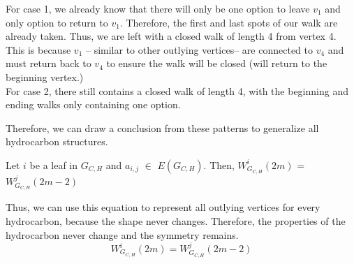 For case 1, we already know that there will only be one option to leave $v_1$ and only option to return to $v_1$.  Therefore, the first and last spots of our walk are already taken.  Thus, we are left with a closed walk of length 4 from vertex 4. This is because $v_1$ -- similar to other outlying vertices-- are connected to $v_4$ and must return back to $v_4$ to ensure the walk will be closed (will return to the beginning vertex.) \\

For case 2, there still contains a closed walk of length 4, with the beginning and ending walks only containing one option. \\
\par Therefore, we can draw a conclusion from these patterns to generalize all hydrocarbon structures.

\begin{proposition}
     Let $i$ be a leaf in $G_{C,H}$ and $a_{i,j}$ $\in$ $E(G_{C,H})$. Then, 
         $W^i_{G_{C,H}}(2m)$ = $W^j_{G_{C,H}}(2m-2)$
 \end{proposition} 
Thus, we can use this equation to represent all outlying vertices for every hydrocarbon, because the shape never changes.  Therefore, the properties of the hydrocarbon never change and the symmetry remains.
 \begin{equation}
     W^i_{G_{C,H}}(2m) = W^j_{G_{C,H}}(2m-2)
 \end{equation}